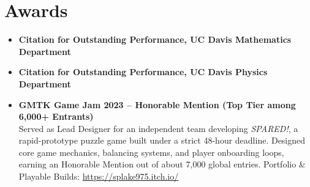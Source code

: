 \documentclass{curriculum-vitae}
\begin{document}
\section*{Awards}
\begin{itemize}
  \item \textbf{Citation for Outstanding Performance, UC Davis Mathematics Department}
  \item \textbf{Citation for Outstanding Performance, UC Davis Physics Department}
  \item \textbf{GMTK Game Jam 2023 -- Honorable Mention (Top Tier among 6,000+ Entrants)}\\
    Served as Lead Designer for an independent team developing \emph{SPARED!}, a rapid-prototype puzzle game built under a strict 48-hour deadline. Designed core game mechanics, balancing systems, and player onboarding loops, earning an Honorable Mention out of about 7,000 global entries.
    \newline Portfolio \& Playable Builds: \url{https://splake975.itch.io/}
\end{itemize}
\end{document}
